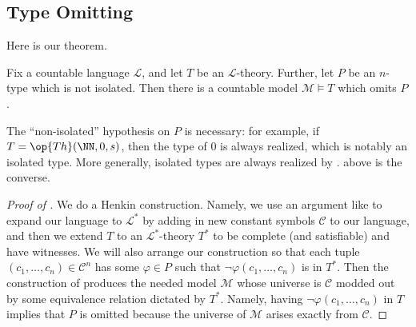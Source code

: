 \documentclass[../notes.tex]{subfiles}
\begin{document}
\subsection{Type Omitting}
Here is our theorem.
\begin{theorem} \label{thm:omit}
	Fix a countable language $\mathcal L$, and let $T$ be an $\mathcal L$-theory. Further, let $P$ be an $n$-type which is not isolated. Then there is a countable model $\mathcal M\models T$ which omits $P$.
\end{theorem}
The ``non-isolated'' hypothesis on $P$ is necessary: for example, if $T=\op{Th}(\NN,0,s)$, then the type of $0$ is always realized, which is notably an isolated type. More generally, isolated types are always realized by .  above is the converse.
\begin{proof}[Proof of ]
	We do a Henkin construction. Namely, we use an argument like  to expand our language to $\mathcal L^*$ by adding in new constant symbols $\mathcal C$ to our language, and then we extend $T$ to an $\mathcal L^*$-theory $T^*$ to be complete (and satisfiable) and have witnesses. We will also arrange our construction so that each tuple $(c_1,\ldots,c_n)\in\mathcal C^n$ has some $\varphi\in P$ such that $\lnot\varphi(c_1,\ldots,c_n)$ is in $T^*$. Then the construction of  produces the needed model $\mathcal M$ whose universe is $\mathcal C$ modded out by some equivalence relation dictated by $T^*$. Namely, having $\lnot\varphi(c_1,\ldots,c_n)$ in $T$ implies that $P$ is omitted because the universe of $\mathcal M$ arises exactly from $\mathcal C$.


\end{proof}
\end{document}
